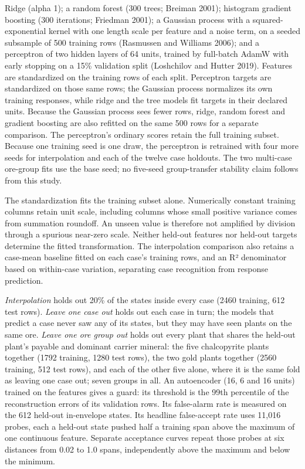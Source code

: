 \documentclass[10pt]{article}
\begin{document}
Ridge (alpha 1); a random forest (300 trees; Breiman 2001); histogram
gradient boosting (300 iterations; Friedman 2001); a Gaussian process
with a squared-exponential kernel with one length scale per feature and
a noise term, on a seeded subsample of 500 training rows (Rasmussen and
Williams 2006); and a perceptron of two hidden layers of 64 units,
trained by full-batch AdamW with early stopping on a 15\% validation
split (Loshchilov and Hutter 2019). Features are standardized on the
training rows of each split. Perceptron targets are standardized on
those same rows; the Gaussian process normalizes its own training
responses, while ridge and the tree models fit targets in their declared
units. Because the Gaussian process sees fewer rows, ridge, random
forest and gradient boosting are also refitted on the same 500 rows for
a separate comparison. The perceptron's ordinary scores retain the full
training subset. Because one training seed is one draw, the perceptron
is retrained with four more seeds for interpolation and each of the
twelve case holdouts. The two multi-case ore-group fits use the base
seed; no five-seed group-transfer stability claim follows from this
study.

The standardization fits the training subset alone. Numerically constant
training columns retain unit scale, including columns whose small
positive variance comes from summation roundoff. An unseen value is
therefore not amplified by division through a spurious near-zero scale.
Neither held-out features nor held-out targets determine the fitted
transformation. The interpolation comparison also retains a case-mean
baseline fitted on each case's training rows, and an R² denominator
based on within-case variation, separating case recognition from
response prediction.

\emph{Interpolation} holds out 20\% of the states inside every case
(2460 training, 612 test rows). \emph{Leave one case out} holds out each
case in turn; the models that predict a case never saw any of its
states, but they may have seen plants on the same ore. \emph{Leave one
ore group out} holds out every plant that shares the held-out plant's
payable and dominant carrier mineral: the five chalcopyrite plants
together (1792 training, 1280 test rows), the two gold plants together
(2560 training, 512 test rows), and each of the other five alone, where
it is the same fold as leaving one case out; seven groups in all. An
autoencoder (16, 6 and 16 units) trained on the features gives a guard:
its threshold is the 99th percentile of the reconstruction errors of its
validation rows. Its false-alarm rate is measured on the 612 held-out
in-envelope states. Its headline false-accept rate uses 11,016 probes,
each a held-out state pushed half a training span above the maximum of
one continuous feature. Separate acceptance curves repeat those probes
at six distances from 0.02 to 1.0 spans, independently above the maximum
and below the minimum.
\end{document}
